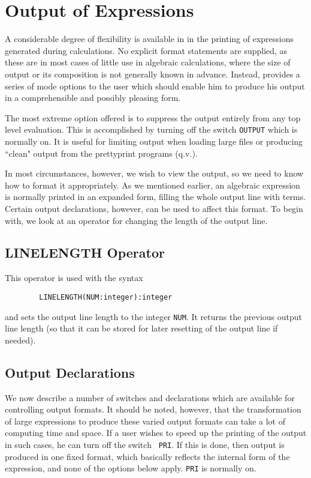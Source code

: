 \section{Output of Expressions}

A considerable degree of flexibility is available in {\REDUCE} in the
printing of expressions generated during calculations.  No explicit format
statements are supplied, as these are in most cases of little use in
algebraic calculations, where the size of output or its composition is not
generally known in advance.  Instead, {\REDUCE} provides a series of mode
options to the user which should enable him to produce his output in a
comprehensible and possibly pleasing form.

The most extreme option offered is to suppress the output entirely from
any top level evaluation.  This is accomplished by turning off the switch
{\tt OUTPUT}  which is normally on.  It is useful for
limiting output when loading large files or producing ``clean" output from
the prettyprint programs (q.v.).

In most circumstances, however, we wish to view the output, so we need to
know how to format it appropriately.  As we mentioned earlier, an
algebraic expression is normally printed in an expanded form, filling the
whole output line with terms.  Certain output declarations,  however, can be used to affect this format.  To begin with,
we look at an operator for changing the length of the output line.

\subsection{LINELENGTH Operator}

This operator is used with the syntax
\begin{verbatim}
        LINELENGTH(NUM:integer):integer
\end{verbatim}
and sets the output line length to the integer {\tt NUM}. It returns the
previous output line length (so that it can be stored for later resetting
of the output line if needed).

\subsection{Output Declarations}

We now describe a number of switches and declarations which are available
for controlling output formats. It should be noted, however, that the
transformation of large expressions to produce these varied output formats
can take a lot of computing time and space. If a user wishes to speed up
the printing of the output in such cases, he can turn off the switch {\tt
PRI}.  If this is done, then output is produced in one fixed
format, which basically reflects the internal form of the expression, and
none of the options below apply. {\tt PRI} is normally on.


